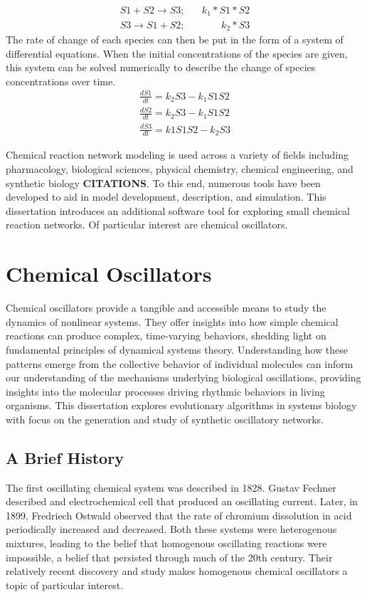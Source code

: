 \documentclass[12pt]{report}
\begin{document}
\begin{equation}
\begin{split}
S1 + S2 \to S3; \;\;\;\;\;\; k_1*S1*S2\\
S3 \to S1 + S2; \;\;\;\;\;\;\;\;\;\;\;\;\; k_2*S3
\end{split}
\end{equation}
The rate of change of each species can then be put in the form of a system of differential equations. When the initial concentrations of the species are given, this system can be solved numerically to describe the change of species concentrations over time.
\begin{equation}
\begin{split}
\frac{dS1}{dt}=k_2S3 - k_1S1S2\\
\frac{dS2}{dt}=k_2S3 -k_1S1S2\\
\frac{dS3}{dt}=k1S1S2 - k_2S3
\end{split}
\end{equation}

Chemical reaction network modeling is used across a variety of fields including pharmacology, biological sciences, physical chemistry, chemical engineering, and synthetic biology \textbf{CITATIONS}. To this end, numerous tools have been developed to aid in model development, description, and simulation. This dissertation introduces an additional software tool for exploring small chemical reaction networks. Of particular interest are chemical oscillators.


\section{Chemical Oscillators}
\label{section:intro_oscillators}

Chemical oscillators provide a tangible and accessible means to study the dynamics of nonlinear systems. They offer insights into how simple chemical reactions can produce complex, time-varying behaviors, shedding light on fundamental principles of dynamical systems theory. Understanding how these patterns emerge from the collective behavior of individual molecules can inform our understanding of the mechanisms underlying biological oscillations, providing insights into the molecular processes driving rhythmic behaviors in living organisms. This dissertation explores evolutionary algorithms in systems biology with focus on the generation and study of synthetic oscillatory networks.

\subsection{A Brief History}
The first oscillating chemical system was described in 1828. Gustav Fechner described and electrochemical cell that produced an oscillating current. Later, in 1899, Fredriech Ostwald observed that the rate of chromium dissolution in acid periodically increased and decreased. Both these systems were heterogenous mixtures, leading to the belief that homogenous oscillating reactions were impossible, a belief that persisted through much of the 20th century. Their relatively recent discovery and study makes homogenous chemical oscillators a topic of particular interest. 
\end{document}
